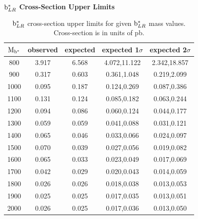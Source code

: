 \begin{table}
\begin{center}
\bf{$\mathrm{b}^{*}_{LR}$ Cross-Section Upper Limits}\\
\begin{tabular}{|c||c|c|c|c|}
\hline
\bf{$\mathrm{M_{\mathrm{b}^{*}}}$} & \bf{observed}  & \bf{expected} & \bf{expected 1$\sigma$}  & \bf{expected 2$\sigma$} \\
\hline
\hline
800 & 3.917 & 6.568 & 4.072,11.122 & 2.342,18.857\\ 
\hline
900 & 0.317 & 0.603 & 0.361,1.048 & 0.219,2.099\\ 
\hline
1000 & 0.095 & 0.187 & 0.124,0.269 & 0.087,0.386\\ 
\hline
1100 & 0.131 & 0.124 & 0.085,0.182 & 0.063,0.244\\ 
\hline
1200 & 0.094 & 0.086 & 0.060,0.124 & 0.044,0.177\\ 
\hline
1300 & 0.059 & 0.059 & 0.041,0.088 & 0.031,0.121\\ 
\hline
1400 & 0.065 & 0.046 & 0.033,0.066 & 0.024,0.097\\ 
\hline
1500 & 0.070 & 0.039 & 0.027,0.056 & 0.019,0.082\\ 
\hline
1600 & 0.065 & 0.033 & 0.023,0.049 & 0.017,0.069\\ 
\hline
1700 & 0.042 & 0.029 & 0.020,0.043 & 0.014,0.059\\ 
\hline
1800 & 0.026 & 0.026 & 0.018,0.038 & 0.013,0.053\\ 
\hline
1900 & 0.025 & 0.025 & 0.017,0.035 & 0.013,0.051\\ 
\hline
2000 & 0.026 & 0.025 & 0.017,0.036 & 0.013,0.050\\ 

\hline
\end{tabular}
\end{center}
\caption{$\mathrm{b}^{*}_{LR}$ cross-section upper limits for given $\mathrm{b}^{*}_{LR}$ mass values.  Cross-section is in units of pb.}
\label{table:bsupperxsecLR}
\end{table}


